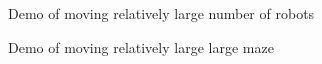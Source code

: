 \documentclass{article}
\begin{document}
\begin{figure}[!t]
\normalsize
\centering
{}
\caption{Demo of moving relatively large number of robots}
\label{m-4} %
\end{figure}

\begin{figure}[!t]
\normalsize
\centering
{}
\caption{Demo of moving relatively large large maze}
\label{m-5} %
\end{figure}
\end{document}
